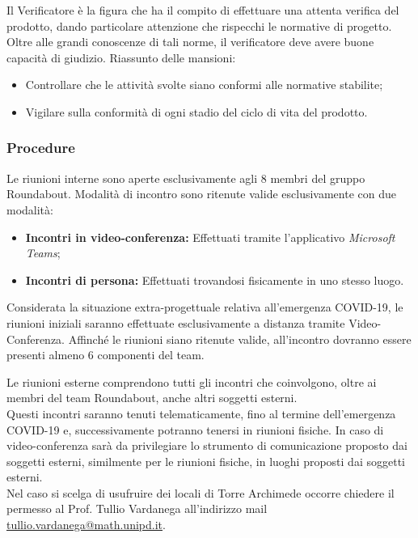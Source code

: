 			Il Verificatore è la figura che ha il compito di effettuare una attenta verifica del prodotto, dando particolare attenzione che rispecchi le normative di progetto. Oltre alle grandi conoscenze di tali norme, il verificatore deve avere buone capacità di giudizio.
			Riassunto delle mansioni:
			\begin{itemize}
				\item Controllare che le attività svolte siano conformi alle normative stabilite;
				\item Vigilare sulla conformità di ogni stadio del ciclo di vita del prodotto.
			\end{itemize}
		
		
		\subsubsection{Procedure}
				Le riunioni interne sono aperte esclusivamente agli 8 membri del gruppo Roundabout. Modalità di incontro sono ritenute valide esclusivamente con due modalità:
				\begin{itemize}
					\item \textbf{Incontri in video-conferenza:} Effettuati tramite l'applicativo \textit{Microsoft Teams};
					\item \textbf{Incontri di persona:} Effettuati trovandosi fisicamente in uno stesso luogo.
				\end{itemize}
				Considerata la situazione extra-progettuale relativa all'emergenza COVID-19, le riunioni iniziali saranno effettuate esclusivamente a distanza tramite Video-Conferenza.
				Affinché le riunioni siano ritenute valide, all'incontro dovranno essere presenti almeno 6 componenti del team.
			
				Le riunioni esterne comprendono tutti gli incontri che coinvolgono, oltre ai membri del team Roundabout, anche altri soggetti esterni.\\
				Questi incontri saranno tenuti telematicamente, fino al termine dell'emergenza COVID-19 e, successivamente potranno tenersi in riunioni fisiche. In caso di video-conferenza sarà da privilegiare lo strumento di comunicazione proposto dai soggetti esterni, similmente per le riunioni fisiche, in luoghi proposti dai soggetti esterni.\\
				Nel caso si scelga di usufruire dei locali di Torre Archimede occorre chiedere il permesso al Prof. Tullio Vardanega all'indirizzo mail \href{mailto:tullio.vardanega@math.unipd.it}{tullio.vardanega@math.unipd.it}.
			
